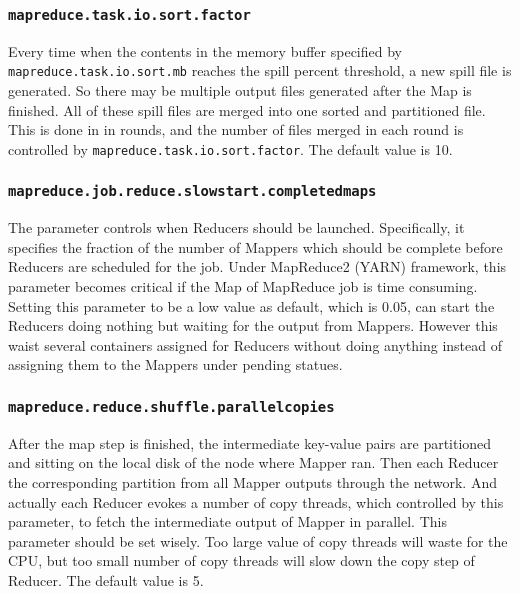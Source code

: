 \subsubsection{\texttt{mapreduce.task.io.sort.factor}}

Every time when the contents in the memory buffer specified by \\
\texttt{mapreduce.task.io.sort.mb} reaches the spill percent threshold, a new
spill file is generated. So there may be multiple output files generated after 
the Map is finished. All of these spill files are merged into one sorted and
partitioned file. This is done in in rounds, and the number of files merged in 
each round is controlled by \texttt{mapreduce.task.io.sort.factor}. The default 
value is 10.

\subsubsection{\texttt{mapreduce.job.reduce.slowstart.completedmaps}}

The parameter controls when Reducers should be launched. Specifically, it specifies
the fraction of the number of Mappers which should be complete before Reducers
are scheduled for the job. Under MapReduce2 (YARN) \cite{YARN} framework, this 
parameter becomes critical if the Map of MapReduce job is time consuming. Setting 
this parameter to be a low value as default, which is 0.05, can start the Reducers
doing nothing but waiting for the output from Mappers. However this waist several
containers assigned for Reducers without doing anything instead of assigning them
to the Mappers under pending statues.   

\subsubsection{\texttt{mapreduce.reduce.shuffle.parallelcopies}}

After the map step is finished, the intermediate key-value pairs are partitioned
and sitting on the local disk of the node where Mapper ran. Then each Reducer 
the corresponding partition from all Mapper outputs through the network. And
actually each Reducer evokes a number of copy threads, which controlled by this
parameter, to fetch the intermediate output of Mapper in parallel. This parameter
should be set wisely. Too large value of copy threads will waste for the CPU,
but too small number of copy threads will slow down the copy step of Reducer.
The default value is 5.

